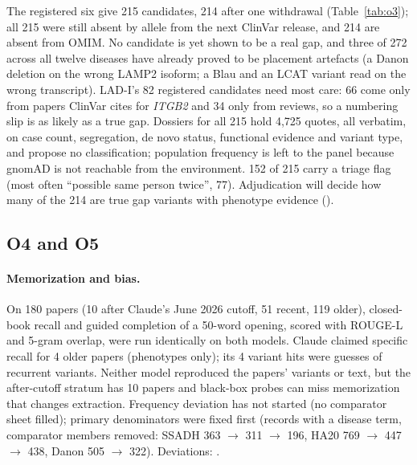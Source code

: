\documentclass{article} %
\begin{document}
The registered six give 215 candidates, 214 after one withdrawal (Table~\ref{tab:o3}); all 215 were still absent by allele from the next ClinVar release, and 214 are absent from OMIM. No candidate is yet shown to be a real gap, and three of 272 across all twelve diseases have already proved to be placement artefacts (a Danon deletion on the wrong LAMP2 isoform; a Blau and an LCAT variant read on the wrong transcript). LAD-I's 82 registered candidates need most care: 66 come only from papers ClinVar cites for \emph{ITGB2} and 34 only from reviews, so a numbering slip is as likely as a true gap. Dossiers for all 215 hold 4,725 quotes, all verbatim, on case count, segregation, de novo status, functional evidence and variant type, and propose no classification; population frequency is left to the panel because gnomAD \citep{Karczewski2020MutationalConstraint} is not reachable from the environment. 152 of 215 carry a triage flag (most often ``possible same person twice'', 77). Adjudication will decide how many of the 214 are true gap variants with phenotype evidence ().

\subsection{O4 and O5}
\label{sec:o4o5}
\paragraph{Memorization and bias.} On 180 papers (10 after Claude's June 2026 cutoff, 51 recent, 119 older), closed-book recall and guided completion of a 50-word opening, scored with ROUGE-L \citep{Lin2002ManualAutomatic} and 5-gram overlap, were run identically on both models. Claude claimed specific recall for 4 older papers (phenotypes only); its 4 variant hits were guesses of recurrent variants. Neither model reproduced the papers' variants or text, but the after-cutoff stratum has 10 papers and black-box probes can miss memorization that changes extraction. Frequency deviation has not started (no comparator sheet filled); primary denominators were fixed first (records with a disease term, comparator members removed: SSADH 363 $\rightarrow$ 311 $\rightarrow$ 196, HA20 769 $\rightarrow$ 447 $\rightarrow$ 438, Danon 505 $\rightarrow$ 322). Deviations: .
\end{document}
